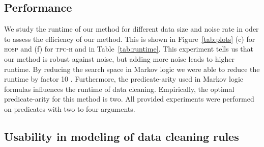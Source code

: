 \subsection{Performance}

We study the runtime of our method for different data size and noise rate in oder to assess the efficiency of our method. This is shown in Figure~\ref{tab:plots} (c) for \textsc{hosp} and (f) for \textsc{tpc-h} and in Table~\ref{tab:runtime}.  This experiment tells us that our method is robust against noise, but adding more noise leads to higher runtime. By reducing the search space in Markov logic we were able to reduce the runtime by factor 10 . Furthermore, the predicate-arity used in Markov logic formulas influences the runtime of data cleaning. Empirically, the optimal predicate-arity for this method is two. All provided experiments were performed on predicates with two to four arguments. 


\subsection{Usability in modeling of data cleaning rules}

